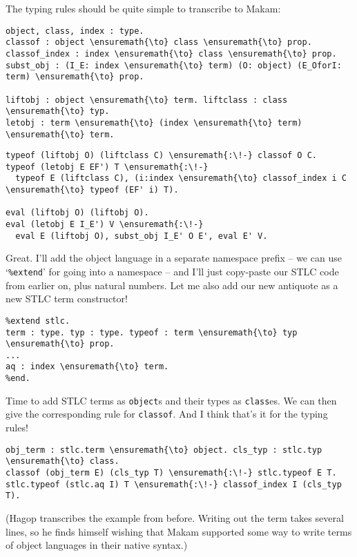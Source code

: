 The typing rules should be quite simple to transcribe to Makam:

\begin{verbatim}
object, class, index : type.
classof : object \ensuremath{\to} class \ensuremath{\to} prop.
classof_index : index \ensuremath{\to} class \ensuremath{\to} prop.
subst_obj : (I_E: index \ensuremath{\to} term) (O: object) (E_OforI: term) \ensuremath{\to} prop.

liftobj : object \ensuremath{\to} term. liftclass : class \ensuremath{\to} typ.
letobj : term \ensuremath{\to} (index \ensuremath{\to} term) \ensuremath{\to} term.
\end{verbatim}

\begin{verbatim}
typeof (liftobj O) (liftclass C) \ensuremath{:\!-} classof O C.
typeof (letobj E EF') T \ensuremath{:\!-}
  typeof E (liftclass C), (i:index \ensuremath{\to} classof_index i C \ensuremath{\to} typeof (EF' i) T).

eval (liftobj O) (liftobj O).
eval (letobj E I_E') V \ensuremath{:\!-}
  eval E (liftobj O), subst_obj I_E' O E', eval E' V.
\end{verbatim}

\heroADVISOR{} Great. I'll add the object language in a separate namespace
prefix -- we can use `\texttt{\%extend}' for going into a namespace --
and I'll just copy-paste our STLC code from earlier on, plus natural
numbers. Let me also add our new antiquote as a new STLC term
constructor!

\begin{verbatim}
%extend stlc.
term : type. typ : type. typeof : term \ensuremath{\to} typ \ensuremath{\to} prop.
...
aq : index \ensuremath{\to} term.
%end.
\end{verbatim}

\heroSTUDENT{} Time to add STLC terms as \texttt{object}s and their types as
\texttt{class}es. We can then give the corresponding rule for
\texttt{classof}. And I think that's it for the typing rules!

\begin{verbatim}
obj_term : stlc.term \ensuremath{\to} object. cls_typ : stlc.typ \ensuremath{\to} class.
classof (obj_term E) (cls_typ T) \ensuremath{:\!-} stlc.typeof E T.
stlc.typeof (stlc.aq I) T \ensuremath{:\!-} classof_index I (cls_typ T).
\end{verbatim}

\begin{scenecomment}
(Hagop transcribes the example from before. Writing out the term takes several lines, so he finds himself
wishing that Makam supported some way to write terms of object languages in their native syntax.)
\end{scenecomment}

